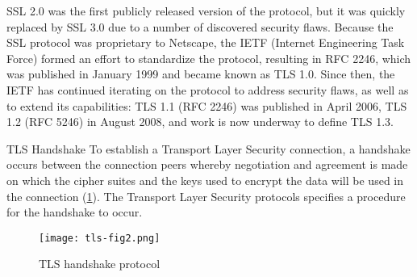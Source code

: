 SSL 2.0 was the first publicly released version of the protocol, but it was quickly replaced by SSL 3.0 due to a number of discovered security flaws. Because the SSL protocol was proprietary to Netscape, the IETF (Internet Engineering Task Force) formed an effort to standardize the protocol, resulting in RFC 2246, which was published in January 1999 and became known as TLS 1.0. Since then, the IETF has continued iterating on the protocol to address security flaws, as well as to extend its capabilities: TLS 1.1 (RFC 2246) was published in April 2006, TLS 1.2 (RFC 5246) in August 2008, and work is now underway to define TLS 1.3.

TLS Handshake
To establish a Transport Layer Security connection, a handshake occurs between the connection peers whereby negotiation and agreement is made on which the cipher suites and the keys used to encrypt the data will be used in the connection (\ref{fig:tlsfig2}). The Transport Layer Security protocols specifies a procedure for the handshake to occur. 

\begin{figure}[h]
\centering
\texttt{[image: tls-fig2.png]}
\caption{TLS handshake protocol \protect\cite{TLS}}
\label{fig:tlsfig2}
\end{figure}

